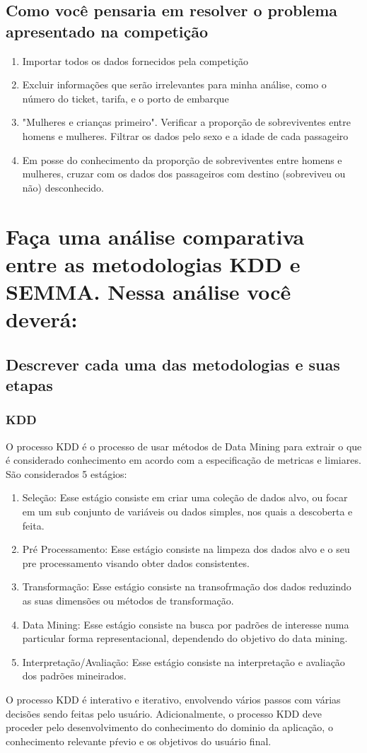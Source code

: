 \documentclass{article}
\begin{document}
\subsection{Como você pensaria em resolver o problema apresentado na competição}
\begin{enumerate}
    \item Importar todos os dados fornecidos pela competição
    \item Excluir informações que serão irrelevantes para minha análise, como o número do ticket, tarifa, e o porto de embarque
    \item "Mulheres e crianças primeiro". Verificar a proporção de sobreviventes entre homens e mulheres. Filtrar os dados pelo sexo e a idade de cada passageiro
    \item Em posse do conhecimento da proporção de sobreviventes entre homens e mulheres, cruzar com os dados dos passageiros com destino (sobreviveu ou não) desconhecido.
\end{enumerate}


\section{Faça uma análise comparativa entre as metodologias KDD e SEMMA. Nessa análise você deverá:}
\subsection{Descrever cada uma das metodologias e suas etapas}
\subsubsection{KDD}
O processo KDD é o processo de usar métodos de Data Mining para extrair o que é considerado conhecimento em acordo com a especificação de metricas e limiares. São considerados 5 estágios:
\begin{enumerate}
    \item Seleção: Esse estágio consiste em criar uma coleção de dados alvo, ou focar em um sub conjunto de variáveis ou dados simples, nos quais a descoberta e feita.
    \item Pré Processamento: Esse estágio consiste na limpeza dos dados alvo e o seu pre processamento visando obter dados consistentes.
    \item Transformação: Esse estágio consiste na transofrmação dos dados reduzindo as suas dimensões ou métodos de transformação.
    \item Data Mining: Esse estágio consiste na busca por padrões de interesse numa particular forma representacional, dependendo do objetivo do data mining.
    \item Interpretação/Avaliação: Esse estágio consiste na interpretação e avaliação dos padrões mineirados.
\end{enumerate}
\noindent
O processo KDD é interativo e iterativo, envolvendo vários passos com várias decisões sendo feitas pelo usuário. Adicionalmente, o processo KDD deve proceder pelo desenvolvimento do conhecimento do dominio da aplicação, o conhecimento relevante pŕevio e os objetivos do usuário final.
\end{document}
